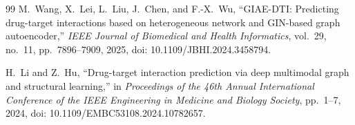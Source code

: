 \documentclass[10pt,conference]{IEEEtran}
\begin{document}
\begin{thebibliography}{99}
 M.~Wang, X.~Lei, L.~Liu, J.~Chen, and F.-X.~Wu, ``GIAE-DTI: Predicting drug-target interactions based on heterogeneous network and GIN-based graph autoencoder,'' \textit{IEEE Journal of Biomedical and Health Informatics}, vol.~29, no.~11, pp.~7896--7909, 2025, doi: 10.1109/JBHI.2024.3458794.

 H.~Li and Z.~Hu, ``Drug-target interaction prediction via deep multimodal graph and structural learning,'' in \textit{Proceedings of the 46th Annual International Conference of the IEEE Engineering in Medicine and Biology Society}, pp.~1--7, 2024, doi: 10.1109/EMBC53108.2024.10782657.

\end{thebibliography}
\end{document}
